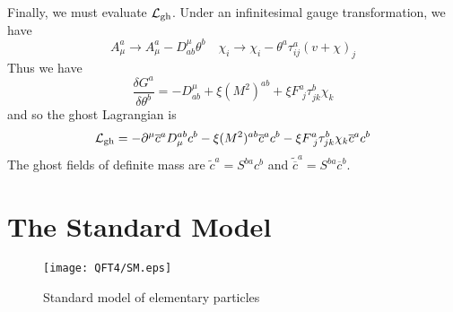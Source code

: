 \\ \\
Finally, we must evaluate $\mathcal{L}_{\rm gh}$. Under an infinitesimal gauge transformation, we have
\[ A^a_{\mu} \to A^a_{\mu} - D^{\mu}_{ab}\theta^b \quad \chi_i \to \chi_i - \theta^a \tau^a_{ij}(v+\chi)_j \]
Thus we have
\[\frac{\delta G^a}{\delta \theta^b} = - D^{\mu}_{ab} + \xi(M^2)^{ab} + \xi F^a_{\phantom{i}j} \tau^b_{jk}\chi_k \]
and so the ghost Lagrangian is
\[\mathcal{L}_{\rm gh} = -\partial^{\mu} \overline{c}^a D_{\mu}^{ab} c^b - \xi (M^2)^{ab}\overline{c}^a c^b - \xi F^a_{\phantom{i}j} \tau^b_{jk}\chi_k \overline{c}^a c^b\]
The ghost fields of definite mass are $\widetilde{c}^a = S^{ba}c^b$ and  $\widetilde{\overline{c}}^a = S^{ba}\overline{c}^b$.

\section{The Standard Model}
\begin{figure}[!h]
\centering
\texttt{[image: QFT4/SM.eps]}
\caption{Standard model of elementary particles}
\end{figure}

